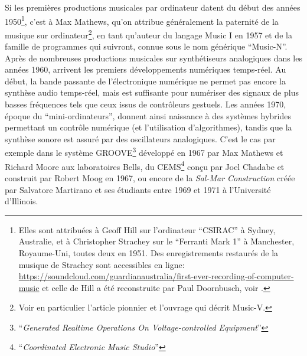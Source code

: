 \noindent Si les premières productions musicales par ordinateur datent du début des années 1950\footnote{Elles sont attribuées à Geoff Hill sur l'ordinateur ``CSIRAC'' à Sydney, Australie, et à Christopher Strachey sur le ``Ferranti Mark 1'' à Manchester, Royaume-Uni, toutes deux en 1951. Des enregistrements restaurés de la musique de Strachey sont accessibles en ligne: \\ \url{https://soundcloud.com/guardianaustralia/first-ever-recording-of-computer-music} et celle de Hill a été reconstruite par Paul Doornbusch, voir \cite{doornbusch_computer_2004}.}, c'est à Max Mathews, qu'on attribue généralement la paternité de la musique sur ordinateur\footnote{Voir en particulier l'article pionnier \cite{mathews_digital_1963} et l'ouvrage \cite{mathews_technology_1969} qui décrit Music-V.}, en tant qu'auteur du langage Music I en 1957 et de la famille de programmes qui suivront, connue sous le nom générique ``Music-N''.\\
\indent Après de nombreuses productions musicales sur synthétiseurs analogiques dans les années 1960, arrivent les premiers développements numériques temps-réel. Au début, la bande passante de l'électronique numérique ne permet pas encore la synthèse audio temps-réel, mais est suffisante pour numériser des signaux de plus basses fréquences tels que ceux issus de contrôleurs gestuels. Les années 1970, époque du ``mini-ordinateurs'', donnent ainsi naissance à des systèmes hybrides permettant un contrôle numérique (et l'utilisation d'algorithmes), tandis que la synthèse sonore est assuré par des oscillateurs analogiques. C'est le cas par exemple dans le système GROOVE\footnote{``\textit{Generated Realtime Operations On Voltage-controlled Equipment}''} développé en 1967 par Max Mathews et Richard Moore aux laboratoires Bells, du CEMS\footnote{``\textit{Coordinated Electronic Music Studio}''} conçu par Joel Chadabe et construit par Robert Moog en 1967, ou encore de la \textit{Sal-Mar Construction} créée par Salvatore Martirano et ses étudiants entre 1969 et 1971 à l'Université d'Illinois.\\
